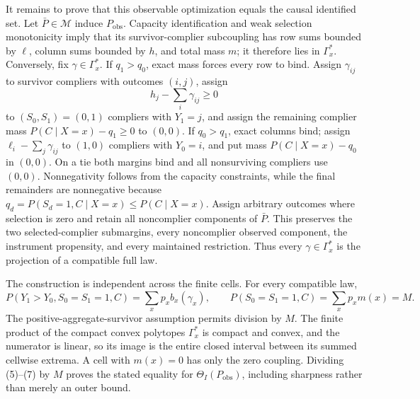 It remains to prove that this observable optimization equals the causal identified set.  Let \(\bar P\in\mathcal M\) induce \(P_{\mathrm{obs}}\).  Capacity identification and weak selection monotonicity imply that its survivor-complier subcoupling has row sums bounded by \(\ell\), column sums bounded by \(h\), and total mass \(m\); it therefore lies in \(\Gamma_x^{\ast}\).  Conversely, fix \(\gamma\in\Gamma_x^{\ast}\).  If \(q_1>q_0\), exact mass forces every row to bind.  Assign \(\gamma_{ij}\) to survivor compliers with outcomes \((i,j)\), assign
\[
h_j-\sum_i\gamma_{ij}\ge0
\]
to \((S_0,S_1)=(0,1)\) compliers with \(Y_1=j\), and assign the remaining complier mass \(P(C\mid X=x)-q_1\ge0\) to \((0,0)\).  If \(q_0>q_1\), exact columns bind; assign \(\ell_i-\sum_j\gamma_{ij}\) to \((1,0)\) compliers with \(Y_0=i\), and put mass \(P(C\mid X=x)-q_0\) in \((0,0)\).  On a tie both margins bind and all nonsurviving compliers use \((0,0)\).  Nonnegativity follows from the capacity constraints, while the final remainders are nonnegative because \(q_d=P(S_d=1,C\mid X=x)\le P(C\mid X=x)\).  Assign arbitrary outcomes where selection is zero and retain all noncomplier components of \(\bar P\).  This preserves the two selected-complier submargins, every noncomplier observed component, the instrument propensity, and every maintained restriction.  Thus every \(\gamma\in\Gamma_x^{\ast}\) is the projection of a compatible full law.

The construction is independent across the finite cells.  For every compatible law,
\[
P(Y_1>Y_0,S_0=S_1=1,C)=\sum_xp_xb_x(\gamma_x),
\qquad
P(S_0=S_1=1,C)=\sum_xp_xm(x)=M.
\]
The positive-aggregate-survivor assumption permits division by \(M\).  The finite product of the compact convex polytopes \(\Gamma_x^{\ast}\) is compact and convex, and the numerator is linear, so its image is the entire closed interval between its summed cellwise extrema.  A cell with \(m(x)=0\) has only the zero coupling.  Dividing (5)--(7) by \(M\) proves the stated equality for \(\Theta_I(P_{\mathrm{obs}})\), including sharpness rather than merely an outer bound.